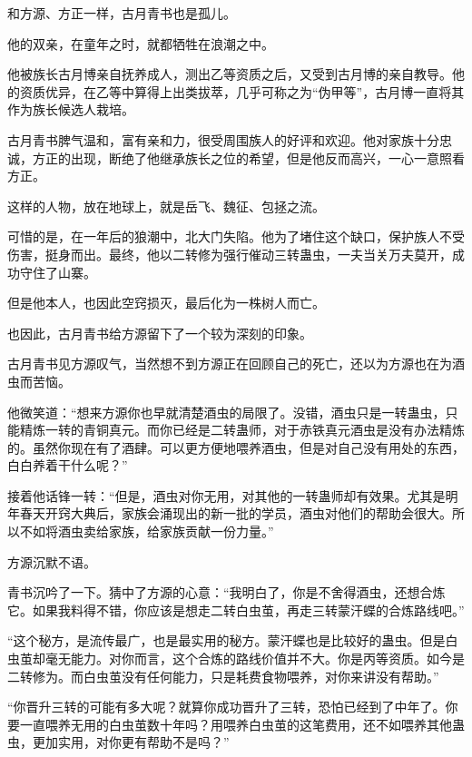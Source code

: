 
\begin{this_body}

和方源、方正一样，古月青书也是孤儿。

他的双亲，在童年之时，就都牺牲在浪潮之中。

他被族长古月博亲自抚养成人，测出乙等资质之后，又受到古月博的亲自教导。他的资质优异，在乙等中算得上出类拔萃，几乎可称之为“伪甲等”，古月博一直将其作为族长候选人栽培。

古月青书脾气温和，富有亲和力，很受周围族人的好评和欢迎。他对家族十分忠诚，方正的出现，断绝了他继承族长之位的希望，但是他反而高兴，一心一意照看方正。

这样的人物，放在地球上，就是岳飞、魏征、包拯之流。

可惜的是，在一年后的狼潮中，北大门失陷。他为了堵住这个缺口，保护族人不受伤害，挺身而出。最终，他以二转修为强行催动三转蛊虫，一夫当关万夫莫开，成功守住了山寨。

但是他本人，也因此空窍损灭，最后化为一株树人而亡。

也因此，古月青书给方源留下了一个较为深刻的印象。

古月青书见方源叹气，当然想不到方源正在回顾自己的死亡，还以为方源也在为酒虫而苦恼。

他微笑道：“想来方源你也早就清楚酒虫的局限了。没错，酒虫只是一转蛊虫，只能精炼一转的青铜真元。而你已经是二转蛊师，对于赤铁真元酒虫是没有办法精炼的。虽然你现在有了酒肆。可以更方便地喂养酒虫，但是对自己没有用处的东西，白白养着干什么呢？”

接着他话锋一转：“但是，酒虫对你无用，对其他的一转蛊师却有效果。尤其是明年春天开窍大典后，家族会涌现出的新一批的学员，酒虫对他们的帮助会很大。所以不如将酒虫卖给家族，给家族贡献一份力量。”

方源沉默不语。

青书沉吟了一下。猜中了方源的心意：“我明白了，你是不舍得酒虫，还想合炼它。如果我料得不错，你应该是想走二转白虫茧，再走三转蒙汗蝶的合炼路线吧。”

“这个秘方，是流传最广，也是最实用的秘方。蒙汗蝶也是比较好的蛊虫。但是白虫茧却毫无能力。对你而言，这个合炼的路线价值并不大。你是丙等资质。如今是二转修为。而白虫茧没有任何能力，只是耗费食物喂养，对你来讲没有帮助。”

“你晋升三转的可能有多大呢？就算你成功晋升了三转，恐怕已经到了中年了。你要一直喂养无用的白虫茧数十年吗？用喂养白虫茧的这笔费用，还不如喂养其他蛊虫，更加实用，对你更有帮助不是吗？”


\end{this_body}
